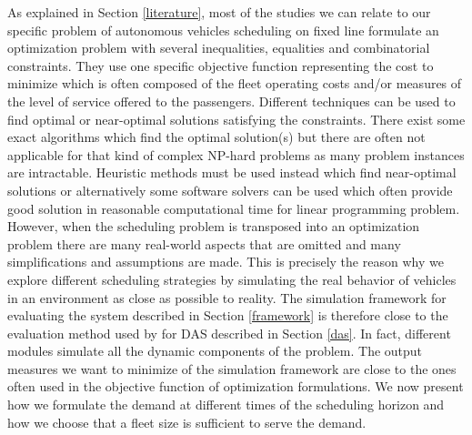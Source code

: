 \documentclass[12pt,a4paper]{article}
\begin{document}
As explained in Section \ref{literature}, most of the studies we can relate to our specific problem of autonomous vehicles scheduling on fixed line formulate an optimization problem with several inequalities, equalities and combinatorial constraints. They use one specific objective function representing the cost to minimize which is often composed of the fleet operating costs and/or measures of the level of service offered to the passengers. Different techniques can be used to find optimal or near-optimal solutions satisfying the constraints. There exist some exact algorithms which find the optimal solution(s) but there are often not applicable for that kind of complex NP-hard problems as many problem instances are intractable. Heuristic methods  must be used instead which find near-optimal solutions or alternatively some software solvers can be used which often provide good solution in reasonable computational time for linear programming problem. However, when the scheduling problem is transposed into an optimization problem there are many real-world aspects that are omitted and many simplifications and assumptions are made. This is precisely the reason why we explore different scheduling strategies by simulating the real behavior of vehicles in an environment as close as possible to reality. The simulation framework for evaluating the system described in Section \ref{framework} is therefore close to the evaluation method used by \cite{evaluation} for DAS described in Section \ref{das}. In fact, different modules simulate all the dynamic components of the problem. The output measures we want to minimize of the simulation framework are close to the ones often used in the objective function of optimization formulations. We now present how we formulate the demand at different times of the scheduling horizon and how we choose that a fleet size is sufficient to serve the demand.
\end{document}
